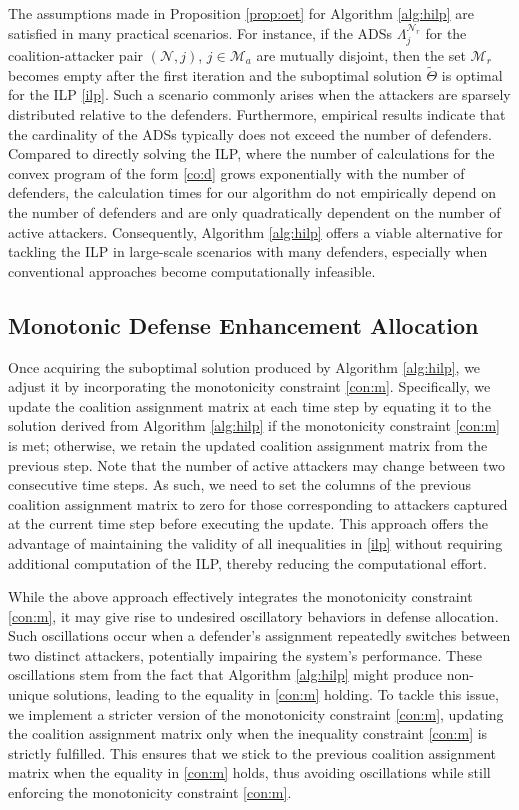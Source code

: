 \documentclass[journal]{IEEEtran}
\newcommand{\N}{\mathcal{N}}
\newcommand{\M}{\mathcal{M}}
\newcommand{\1}{\mathbf{1}}
\begin{document}
The assumptions made in Proposition \ref{prop:oet} for Algorithm \ref{alg:hilp} are satisfied in many practical scenarios. For instance, if the ADSs $\Lambda^{\N_r}_j$ for the coalition-attacker pair $(\N,j)$, $j\in \M_a$ are mutually disjoint, then the set $\M_r$ becomes empty after the first iteration and the suboptimal solution $\tilde{\Theta}$ is optimal for the ILP \eqref{ilp}. Such a scenario commonly arises when the attackers are sparsely distributed relative to the defenders. Furthermore, empirical results indicate that the cardinality of the ADSs typically does not exceed the number of defenders. Compared to directly solving the ILP, where the number of calculations for the convex program of the form \eqref{co:d} grows exponentially with the number of defenders, the calculation times for our algorithm do not empirically depend on the number of defenders and are only quadratically dependent on the number of active attackers. Consequently, Algorithm \ref{alg:hilp} offers a viable alternative for tackling the ILP in large-scale scenarios with many defenders, especially when conventional approaches become computationally infeasible.

\subsection{Monotonic Defense Enhancement Allocation}\label{sec:4.4}

Once acquiring the suboptimal solution produced by Algorithm \ref{alg:hilp}, we adjust it by incorporating the monotonicity constraint \eqref{con:m}. Specifically, we update the coalition assignment matrix at each time step by equating it to the solution derived from Algorithm \ref{alg:hilp} if the monotonicity constraint \eqref{con:m} is met; otherwise, we retain the updated coalition assignment matrix from the previous step. Note that the number of active attackers may change between two consecutive time steps. As such, we need to set the columns of the previous coalition assignment matrix to zero for those corresponding to attackers captured at the current time step before executing the update. This approach offers the advantage of maintaining the validity of all inequalities in \eqref{ilp} without requiring additional computation of the ILP, thereby reducing the computational effort.

While the above approach effectively integrates the monotonicity constraint \eqref{con:m}, it may give rise to undesired oscillatory behaviors in defense allocation. Such oscillations occur when a defender's assignment repeatedly switches between two distinct attackers, potentially impairing the system's performance. These oscillations stem from the fact that Algorithm \ref{alg:hilp} might produce non-unique solutions, leading to the equality in \eqref{con:m} holding. To tackle this issue, we implement a stricter version of the monotonicity constraint \eqref{con:m}, updating the coalition assignment matrix only when the inequality constraint \eqref{con:m} is strictly fulfilled. This ensures that we stick to the previous coalition assignment matrix when the equality in \eqref{con:m} holds, thus avoiding oscillations while still enforcing the monotonicity constraint \eqref{con:m}. 
\end{document}
